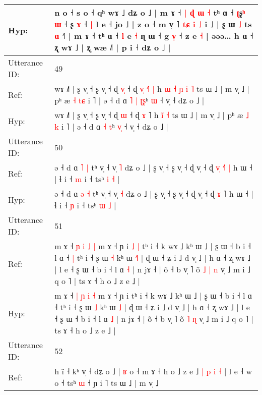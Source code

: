 \documentclass[10pt]{article}
\DeclareRobustCommand{\hl}[1]{{\textcolor{red}{#1}}}
\begin{document}
\begin{longtable}{ll}
 \\
Hyp: & n o ˧\hl{}\hl{} \hl{}s\hl{} o ˧ qʰ wɤ ˩ dʑ o ˩ | m ɤ ˧ \hl{|} \hl{ɖ} \hl{ɯ} \hl{˧} tʰ ɑ ˧ \hl{ʈ}ʂ\hl{ʰ} \hl{ɯ} ˧ ʂ \hl{ɤ} ˧\hl{ }\hl{|} l e ˧ jo ˩ | z o ˧ m v̩ ˥\hl{}\hl{} \hl{}\hl{}\hl{}\hl{t}\hl{ɕ} \hl{i} \hl{}\hl{˩} i ˩ | ʂ ɯ \hl{˩} ts \hl{ɑ} ˧˥ | m ɤ ˧ tʰ ɑ ˧ \hl{l} e\hl{}\hl{} \hl{˧} ɳ ɯ ˧ g \hl{v}\hl{̩} ˧ z e \hl{˧} | əəə… h ɑ ˧ ʐ wɤ ˩ | ʐ wæ ˩˥ | p i ˧ dʑ o ˩ |
 \\
\midrule
Utterance ID: & 49 \\
Ref: & wɤ ˩˥ | ʂ v̩ ˧ ʂ v̩ ˧ ɖ \hl{v}\hl{̩} ˧ ɖ \hl{v}\hl{̩} \hl{˧}˥\hl{ }\hl{|} h\hl{ }\hl{ɯ}\hl{ }\hl{˧} \hl{ɲ}\hl{ }\hl{i} \hl{˥} ts ɯ ˩ | m v̩ ˩ | pʰ æ \hl{˧} \hl{t}\hl{ɕ} i ˥ | ə ˧ d ɑ\hl{ }\hl{˥} \hl{|} \hl{ʈ}\hl{ʂ}ʰ \hl{}\hl{ɯ} ˧ v̩ ˧ dʑ o ˩ |
 \\
Hyp: & wɤ ˩˥ | ʂ v̩ ˧ ʂ v̩ ˧ ɖ \hl{}\hl{ɯ} ˧ ɖ \hl{}\hl{ɤ} \hl{}˥\hl{}\hl{} h\hl{}\hl{}\hl{}\hl{} \hl{}\hl{i}\hl{̃} \hl{˧} ts ɯ ˩ | m v̩ ˩ | pʰ æ \hl{˩} \hl{}\hl{k} i ˥ | ə ˧ d ɑ\hl{}\hl{} \hl{˧} \hl{}\hl{t}ʰ \hl{v}\hl{̩} ˧ v̩ ˧ dʑ o ˩ |
 \\
\midrule
Utterance ID: & 50 \\
Ref: & ə ˧ d ɑ \hl{˥} \hl{|} tʰ v̩ ˧ v̩ \hl{˥} dʑ o ˩ | ʂ v̩ ˧ ʂ v̩ ˧ ɖ v̩ ˧ ɖ \hl{v}\hl{̩} \hl{˧}˥\hl{ }\hl{|} h ɯ ˧ | ɬ i ˧ \hl{m} i ˧ tsʰ \hl{i} \hl{˧} |
 \\
Hyp: & ə ˧ d ɑ \hl{ə} \hl{˧} tʰ v̩ ˧ v̩ \hl{˧} dʑ o ˩ | ʂ v̩ ˧ ʂ v̩ ˧ ɖ v̩ ˧ ɖ \hl{}\hl{ɤ} \hl{}˥\hl{}\hl{} h ɯ ˧ | ɬ i ˧ \hl{ɲ} i ˧ tsʰ \hl{ɯ} \hl{˩} |
 \\
\midrule
Utterance ID: & 51 \\
Ref: & m ɤ ˧ \hl{ɲ} \hl{i} \hl{˩} \hl{|} m ɤ ˧ ɲ i\hl{ }\hl{˩}\hl{ }\hl{|} tʰ i ˧ k wɤ ˩ kʰ ɯ ˩ | ʂ ɯ ˧ b i ˧ l ɑ ˧\hl{ }\hl{|} tʰ i ˧ ʂ ɯ \hl{˧} kʰ ɯ \hl{˧}\hl{˥} | ɖ ɯ ˧ ʑ i ˩ d v̩ ˩ | h ɑ ˧ ʐ wɤ ˩ | l e ˧ ʂ ɯ ˧ b i ˧ l ɑ \hl{˧} | n jɤ ˧ | õ ˧ b v̩ ˥ õ\hl{ }\hl{˩} \hl{|} \hl{n} v̩ ˩ m i ˩ q o ˥ | ts ɤ ˧ h o ˩ z e ˩ |
 \\
Hyp: & m ɤ ˧ \hl{|} \hl{ɲ} \hl{i} \hl{˧} m ɤ ˧ ɲ i\hl{}\hl{}\hl{}\hl{} tʰ i ˧ k wɤ ˩ kʰ ɯ ˩ | ʂ ɯ ˧ b i ˧ l ɑ ˧\hl{}\hl{} tʰ i ˧ ʂ ɯ \hl{˩} kʰ ɯ \hl{}\hl{˩} | ɖ ɯ ˧ ʑ i ˩ d v̩ ˩ | h ɑ ˧ ʐ wɤ ˩ | l e ˧ ʂ ɯ ˧ b i ˧ l ɑ \hl{˩} | n jɤ ˧ | õ ˧ b v̩ ˥ õ\hl{}\hl{} \hl{˥} \hl{ɳ} v̩ ˩ m i ˩ q o ˥ | ts ɤ ˧ h o ˩ z e ˩ |
 \\
\midrule
Utterance ID: & 52 \\
Ref: & h ĩ ˧ kʰ v̩ ˧ dʑ o ˩ | \hl{ʁ} o ˧ m ɤ ˧ h o ˩ z e ˩\hl{ }\hl{|}\hl{ }\hl{p}\hl{ }\hl{i}\hl{ }\hl{˧} | l e ˧ w o ˧ tsʰ \hl{}\hl{ɯ} ˧ ɲ i ˥ ts ɯ ˩ | m v̩ ˩

\end{longtable}
\end{document}

